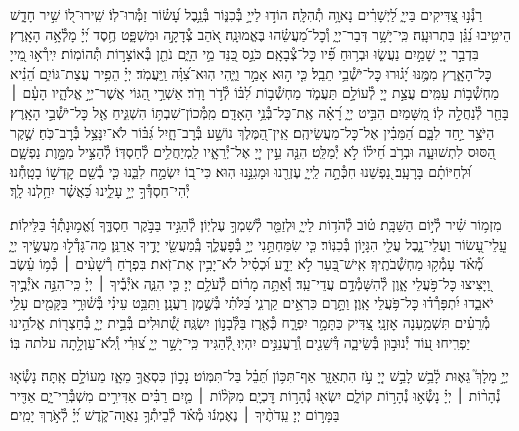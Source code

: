 \documentclass[twoside, openany, parskip=half, 11pt]{book}
\begin{document}
\begin{narrow}
רַנְּ֯נ֣וּ צַ֭דִּיקִים בַּייָ֑
לַ֝יְשָׁרִ֗ים נָאוָ֥ה תְ֯הִלָּֽה׃
הוֹד֣וּ לַייָ֣ בְּ֯כִנּ֑וֹר בְּ֯נֵ֥בֶל עָ֝שׂ֗וֹר זַמְּ֯רוּ־לֽוֹ׃
שִֽׁירוּ־ל֭וֹ שִׁ֣יר חָדָ֑שׁ הֵיטִ֥יבוּ נַ֝גֵּ֗ן בִּתְרוּעָֽה׃
כִּֽי־יָשָׁ֥ר דְּבַר־יְיָ֑ וְ֯כׇל־מַ֝עֲשֵׂ֗הוּ בֶּאֱמוּנָֽה׃
אֹ֭הֵב צְ֯דָקָ֣ה וּמִשְׁפָּ֑ט חֶ֥סֶד יְ֝יָ֗ מָלְ֯אָ֥ה הָאָֽרֶץ׃
בִּדְבַ֣ר יְיָ֭ שָׁמַ֣יִם נַעֲשׂ֑וּ וּבְר֥וּחַ פִּ֗֝יו כׇּל־צְ֯בָאָֽם׃
כֹּנֵ֣ס כַּ֭נֵּד מֵ֣י הַיָּ֑ם נֹתֵ֖ן בְּ֯אוֹצָר֣וֹת תְּ֯הוֹמֽוֹת׃
יִֽירְ֯א֣וּ מֵ֭ייָ כׇּל־הָאָ֑רֶץ מִמֶּ֥נּוּ יָ֝ג֗וּרוּ כׇּל־יֹשְׁ֯בֵ֥י תֵבֵֽל׃
כִּ֤י ה֣וּא אָמַ֣ר וַיֶּ֑הִי הֽוּא־צִ֝וָּ֗ה וַֽיַּעֲמֹֽד׃
יְיָ֗ הֵפִ֥יר עֲצַת־גּוֹיִ֑ם הֵ֝נִ֗יא מַחְשְׁ֯ב֥וֹת עַמִּֽים׃
עֲצַ֣ת יְיָ֭ לְ֯עוֹלָ֣ם תַּעֲמֹ֑ד מַחְשְׁ֯ב֥וֹת לִ֝בּ֗וֹ לְ֯דֹ֣ר וָדֹֽר׃
אַשְׁרֵ֣י הַ֭גּוֹי אֲשֶׁר־יְיָ֣ אֱלֹהָ֑יו הָעָ֓ם ׀ בָּחַ֖ר לְ֯נַחֲלָ֣ה לֽוֹ׃
מִ֭שָּׁמַיִם הִבִּ֣יט יְיָ֑ רָ֝אָ֗ה אֶֽת־כׇּל־בְּ֯נֵ֥י הָאָדָֽם׃
מִֽמְּ֯כוֹן־שִׁבְתּ֥וֹ הִשְׁגִּ֑יחַ אֶ֖ל כׇּל־יֹשְׁ֯בֵ֣י הָאָֽרֶץ׃
הַיֹּצֵ֣ר יַ֣חַד לִבָּ֑ם הַ֝מֵּבִ֗ין אֶל־כׇּל־מַעֲשֵׂיהֶֽם׃
אֵֽין־הַ֭מֶּלֶךְ נוֹשָׁ֣ע בְּ֯רׇב־חָ֑יִל גִּ֝בּ֗וֹר לֹא־יִנָּצֵ֥ל בְּ֯רׇב־כֹּֽחַ׃
שֶׁ֣קֶר הַ֭סּוּס לִתְשׁוּעָ֑ה וּבְרֹ֥ב חֵ֝יל֗וֹ לֹ֣א יְ֯מַלֵּֽט׃
הִנֵּ֤ה עֵ֣ין יְיָ֭ אֶל־יְ֯רֵאָ֑יו לַֽמְיַחֲלִ֥ים לְ֯חַסְדּֽוֹ׃
לְ֯הַצִּ֣יל מִמָּ֣וֶת נַפְשָׁ֑ם וּ֝לְחַיּוֹתָ֗ם בָּרָעָֽב׃
נַ֭פְשֵׁנוּ חִכְּ֯תָ֣ה לַֽייָ֑ עֶזְרֵ֖נוּ וּמָגִנֵּ֣נוּ הֽוּא׃
כִּי־ב֭וֹ יִשְׂמַ֣ח לִבֵּ֑נוּ כִּ֤י בְ֯שֵׁ֖ם קׇדְשׁ֣וֹ בָטָֽחְ֯נוּ׃
יְ֯הִי־חַסְדְּ֯ךָ֣ יְיָ֣ עָלֵ֑ינוּ כַּ֝אֲשֶׁ֗ר יִחַ֥לְנוּ לָֽךְ׃


מִזְמ֥וֹר שִׁ֗יר לְ֯י֣וֹם הַשַּׁבָּֽת׃\hfill \break
ט֗וֹב לְ֯הֹד֥וֹת לַייָ֑ וּלְזַמֵּ֖ר לְ֯שִׁמְךָ֣ עֶלְיֽוֹן׃
לְ֯הַגִּ֣יד בַּבֹּ֣קֶר חַסְדֶּ֑ךָ וֶ֝אֱמ֥וּנָתְ֯ךָ֗ בַּלֵּילֽוֹת׃
עֲֽלֵי־עָ֭שׂוֹר וַעֲלֵי־נָ֑בֶל עֲלֵ֖י הִגָּי֣וֹן בְּ֯כִנּֽוֹר׃
כִּ֤י שִׂמַּחְתַּ֣נִי יְיָ֣ בְּ֯פׇעֳלֶ֑ךָ בְּֽ֯מַעֲשֵׂ֖י יָדֶ֣יךָ אֲרַנֵּֽן׃
מַה־גָּדְ֯ל֣וּ מַעֲשֶׂ֣יךָ יְיָ֑ מְ֯֝אֹ֗ד עָמְ֯ק֥וּ מַחְשְׁ֯בֹתֶֽיךָ׃
אִֽישׁ־בַּ֭עַר לֹ֣א יֵדָ֑ע וּ֝כְסִ֗יל לֹא־יָבִ֥ין אֶת־זֹֽאת׃
בִּפְרֹ֤חַ רְ֯שָׁעִ֨ים ׀ כְּ֯מ֥וֹ עֵ֗שֶׂב וַ֭יָּצִיצוּ כׇּל־פֹּ֣עֲלֵי אָ֑וֶן לְ֯הִשָּׁמְ֯דָ֥ם עֲדֵי־עַֽד׃
וְ֯אַתָּ֥ה מָר֗וֹם לְ֯עֹלָ֥ם יְיָ׃
כִּ֤י הִנֵּ֪ה אֹיְ֯בֶ֡יךָ ׀ יְיָ֗ כִּֽי־הִנֵּ֣ה אֹיְ֯בֶ֣יךָ יֹאבֵ֑דוּ יִ֝תְפָּרְ֯ד֗וּ כׇּל־פֹּ֥עֲלֵי אָֽוֶן׃
וַתָּ֣רֶם כִּרְאֵ֣ים קַרְנִ֑י בַּ֝לֹּתִ֗י בְּ֯שֶׁ֣מֶן רַעֲנָֽן׃
וַתַּבֵּ֥ט עֵינִ֗י בְּ֯שׁ֫וּרָ֥י בַּקָּמִ֖ים עָלַ֥י מְ֯רֵעִ֗ים תִּשְׁמַ֥עְנָה אׇזְנָֽי׃
צַ֭דִּיק כַּתָּמָ֣ר יִפְרָ֑ח כְּ֯אֶ֖רֶז בַּלְּ֯בָנ֣וֹן יִשְׂגֶּֽה׃
שְׁ֭֯תוּלִים בְּ֯בֵ֣ית יְיָ֑ בְּ֯חַצְר֖וֹת אֱלֹהֵ֣ינוּ יַפְרִֽיחוּ׃
ע֭וֹד יְ֯נוּב֣וּן בְּ֯שֵׂיבָ֑ה דְּ֯שֵׁנִ֖ים וְֽ֯רַעֲנַנִּ֣ים יִהְיֽוּ׃
לְ֭֯הַגִּיד כִּֽי־יָשָׁ֣ר יְיָ֑ צ֝וּרִ֗י וְֽ֯לֹא־עַוְלָ֥תָה עלתה בּֽוֹ׃



יְיָ֣ מָלָךְ֮ גֵּא֢וּת לָ֫בֵ֥שׁ
לָבֵ֣שׁ יְיָ֭ עֹ֣ז הִתְאַזָּ֑ר אַף־תִּכּ֥וֹן תֵּ֝בֵ֗ל בַּל־תִּמּֽוֹט׃
נָכ֣וֹן כִּסְאֲךָ֣ מֵאָ֑ז מֵעוֹלָ֣ם אָֽתָּה׃
נָשְׂ֯א֤וּ נְ֯הָר֨וֹת ׀ יְיָ֗ נָשְׂ֯א֣וּ נְ֯הָר֣וֹת קוֹלָ֑ם יִשְׂא֖וּ נְ֯הָר֣וֹת דׇּכְיָֽם׃
מִקֹּל֨וֹת ׀ מַ֤יִם רַבִּ֗ים אַדִּירִ֣ים מִשְׁבְּ֯רֵי־יָ֑ם אַדִּ֖יר בַּמָּר֣וֹם יְיָ׃
עֵֽדֹתֶ֨יךָ ׀ נֶאֶמְנ֬וּ מְ֯אֹ֗ד לְ֯בֵיתְ֯ךָ֥ נַאֲוָה־קֹ֑דֶשׁ יְ֝יָ֗ לְ֯אֹ֣רֶךְ יָמִֽים׃

\end{narrow}
\end{document}
